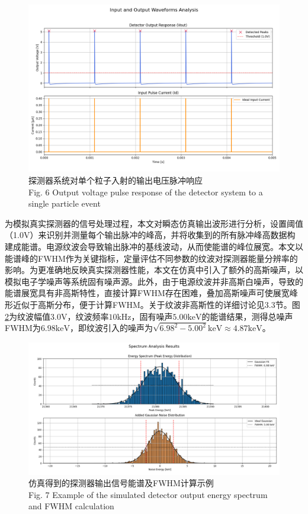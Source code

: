 \documentclass{ctexart}
\begin{document}
\begin{figure}[!h]
    \centering
    \includegraphics[width=\linewidth]{./circ_sim_response.png}
    \caption{探测器系统对单个粒子入射的输出电压脉冲响应 \\ Fig. 6 Output voltage pulse response of the detector system to a single particle event}
    \label{fig:circ_sim_response}
\end{figure}

为模拟真实探测器的信号处理过程，本文对瞬态仿真输出波形进行分析，设置阈值（1.0V）来识别并测量每个输出脉冲的峰高，并将收集到的所有脉冲峰高数据构建成能谱。电源纹波会导致输出脉冲的基线波动，从而使能谱的峰位展宽。本文以能谱峰的FWHM作为关键指标，定量评估不同参数的纹波对探测器能量分辨率的影响。为更准确地反映真实探测器性能，本文在仿真中引入了额外的高斯噪声，以模拟电子学噪声等系统固有噪声源。此外，由于电源纹波并非高斯白噪声，导致的能谱展宽具有非高斯特性，直接计算FWHM存在困难，叠加高斯噪声可使展宽峰形近似于高斯分布，便于计算FWHM。关于纹波非高斯性的详细讨论见3.3节。图\ref{fig:circ_sim_fwhm}为纹波幅值$3.0\mathrm{V}$，纹波频率$10\mathrm{kHz}$，固有噪声$5.00\mathrm{keV}$的能谱结果，测得总噪声FWHM为$6.98\mathrm{keV}$，即纹波引入的噪声为$\sqrt{6.98^2-5.00^2}\mathrm{keV}\approx4.87\mathrm{keV}$。

\begin{figure}[!h]
    \centering
    \includegraphics[width=\linewidth]{./circ_sim_fwhm.png}
    \caption{仿真得到的探测器输出信号能谱及FWHM计算示例 \\ Fig. 7 Example of the simulated detector output energy spectrum and FWHM calculation}
    \label{fig:circ_sim_fwhm}
\end{figure}
\end{document}

